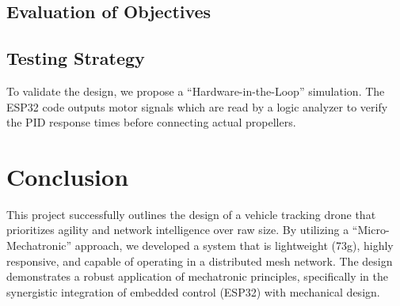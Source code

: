 \documentclass[12pt, a4paper]{article}
\begin{document}
\subsection{Evaluation of Objectives}

\subsection{Testing Strategy}
To validate the design, we propose a ``Hardware-in-the-Loop'' simulation. The ESP32 code outputs motor signals which are read by a logic analyzer to verify the PID response times before connecting actual propellers.

\section{Conclusion}
This project successfully outlines the design of a vehicle tracking drone that prioritizes agility and network intelligence over raw size. By utilizing a ``Micro-Mechatronic'' approach, we developed a system that is lightweight (73g), highly responsive, and capable of operating in a distributed mesh network. The design demonstrates a robust application of mechatronic principles, specifically in the synergistic integration of embedded control (ESP32) with mechanical design.
\end{document}
